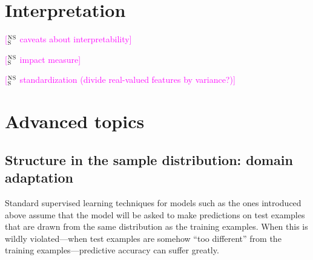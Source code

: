 \documentclass[11pt,letterpaper]{article}
\newcommand{\ensuretext}[1]{#1}
\newcommand{\nssmarker}{\ensuretext{\textcolor{magenta}{\ensuremath{^{\textsc{NS}}_{\textsc{S}}}}}}
\newcommand{\arkcomment}[3]{\ensuretext{\textcolor{#3}{[#1 #2]}}}
\newcommand{\nss}[1]{\arkcomment{\nssmarker}{#1}{magenta}}
\begin{document}





\section{Interpretation}\label{sec:interp}

\nss{caveats about interpretability}

\nss{impact measure}

\nss{standardization (divide real-valued features by variance?)}

\section{Advanced topics}

% 
% 

\subsection{Structure in the sample distribution: domain adaptation}

Standard supervised learning techniques for models such as the ones introduced above 
assume that the model will be asked to make predictions on test examples 
that are drawn from the same distribution as the training examples. 
When this is wildly violated---when test examples are somehow ``too different'' 
from the training examples---predictive accuracy can suffer greatly.
\end{document}
